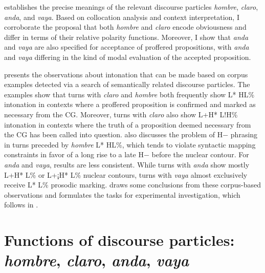  establishes the precise meanings of the relevant discourse particles \textit{hombre}, \textit{claro}, \textit{anda}, and \textit{vaya}. Based on collocation analysis and context interpretation, I corroborate the proposal that both \textit{hombre} and \textit{claro} encode obviousness and differ in terms of their relative polarity functions. Moreover, I show that \textit{anda} and \textit{vaya} are also specified for acceptance of proffered propositions, with \textit{anda} and \textit{vaya} differing in the kind of modal evaluation of the accepted proposition.

 presents the observations about intonation that can be made based on corpus examples detected via a search of semantically related discourse particles. The examples show that turns with \textit{claro} and \textit{hombre} both frequently show L* HL\% intonation in contexts where a proffered proposition is confirmed and marked as necessary from the \ac{CG}. Moreover, turns with \textit{claro} also show L+H* L!H\% intonation in contexts where the truth of a proposition deemed necessary from the \ac{CG} has been called into question.  also discusses the problem of H$-$ phrasing in turns preceded by \textit{hombre} L* HL\%, which tends to violate syntactic mapping constraints in favor of a long rise to a late H$-$ before the nuclear contour. For \textit{anda} and \textit{vaya}, results are less consistent. While turns with \textit{anda} show mostly L+H* L\% or L+¡H* L\% nuclear contours, turns with \textit{vaya} almost exclusively receive L* L\% prosodic marking.  draws some conclusions from these corpus-based observations and formulates the tasks for experimental investigation, which follows in .

\section{Functions of discourse particles: \textit{hombre}, \textit{claro}, \textit{anda}, \textit{vaya}}
\label{ch:5.1}\largerpage

